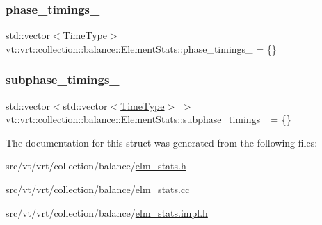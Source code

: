 \mbox{\label{structvt_1_1vrt_1_1collection_1_1balance_1_1_element_stats_ac3df7cd0b637aef1e0faa92bb0193542}} 
\subsubsection{\texorpdfstring{phase\+\_\+timings\+\_\+}{phase\_timings\_}}
{\footnotesize\ttfamily std\+::vector$<$\hyperlink{namespacevt_a876a9d0cd5a952859c72de8a46881442}{Time\+Type}$>$ vt\+::vrt\+::collection\+::balance\+::\+Element\+Stats\+::phase\+\_\+timings\+\_\+ = \{\}\hspace{0.3cm}{\ttfamily [protected]}}

\mbox{\label{structvt_1_1vrt_1_1collection_1_1balance_1_1_element_stats_a27ee2ef1979d4e4e9e4ca34fa8e88591}} 
\subsubsection{\texorpdfstring{subphase\+\_\+timings\+\_\+}{subphase\_timings\_}}
{\footnotesize\ttfamily std\+::vector$<$std\+::vector$<$\hyperlink{namespacevt_a876a9d0cd5a952859c72de8a46881442}{Time\+Type}$>$ $>$ vt\+::vrt\+::collection\+::balance\+::\+Element\+Stats\+::subphase\+\_\+timings\+\_\+ = \{\}\hspace{0.3cm}{\ttfamily [protected]}}



The documentation for this struct was generated from the following files\+:\begin{DoxyCompactItemize}
\item 
src/vt/vrt/collection/balance/\hyperlink{elm__stats_8h}{elm\+\_\+stats.\+h}\item 
src/vt/vrt/collection/balance/\hyperlink{elm__stats_8cc}{elm\+\_\+stats.\+cc}\item 
src/vt/vrt/collection/balance/\hyperlink{elm__stats_8impl_8h}{elm\+\_\+stats.\+impl.\+h}\end{DoxyCompactItemize}
